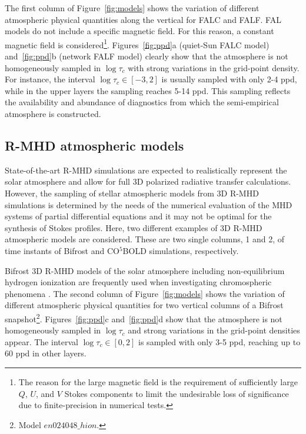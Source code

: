 \documentclass[iop,numberedappendix,twocolappendix,twocolumn]{emulateapj}
\begin{document}
The first column of Figure~\ref{fig:models} shows the variation of different atmospheric physical quantities along the vertical for FALC and FALF.
FAL models do not include a specific magnetic field. For this reason, a constant magnetic field is considered\footnote{The reason for the large magnetic field is the requirement of sufficiently large $Q$, $U$, and $V$ Stokes components to limit the undesirable loss of significance due to finite-precision in numerical tests.}.
Figures~\ref{fig:ppd}a (quiet-Sun FALC model) and~\ref{fig:ppd}b (network FALF model) clearly show that the atmosphere
is not homogeneously sampled in $\log \tau_c$ with strong variations in the grid-point density. For instance, the interval $\log\tau_c\in[-3,2]$
is usually sampled with only 2-4 ppd, while in the upper layers the sampling reaches 5-14 ppd.
This sampling reflects the availability and abundance of diagnostics from which the semi-empirical atmosphere is constructed. 
%
%
\subsection{R-MHD atmospheric models}\label{subsec:2.4}
%
State-of-the-art R-MHD simulations are expected to realistically represent the solar atmosphere and allow for full 3D polarized radiative transfer calculations.
However, the sampling of stellar atmospheric models from 3D R-MHD simulations is determined by the needs of the numerical evaluation of the MHD systems of partial differential equations and it may not be optimal for the synthesis of Stokes profiles. Here, two different examples of 3D R-MHD atmospheric models are considered.
These are two single columns, 1 and 2, of time instants of Bifrost and CO$^5$BOLD simulations, respectively.

Bifrost 3D R-MHD models of the solar atmosphere including non-equilibrium hydrogen ionization \citep[see e.g.,][]{gudiksen2011,carlsson2016} are frequently used when investigating chromospheric phenomena \citep[e.g.,][]{stepan2015,carlin2017}. The second column of Figure~\ref{fig:models} shows the variation of different atmospheric physical quantities
for two vertical columns of a Bifrost snapshot\footnote{Model $en024048\_hion$.}. 
Figures~\ref{fig:ppd}c and~\ref{fig:ppd}d show that the atmosphere is not homogeneously sampled in $\log \tau_c$ and strong variations
in the grid-point densities appear. The interval $\log\tau_c\in[0,2]$ is sampled with only 3-5 ppd, reaching up to 60 ppd in other layers. 
\end{document}
